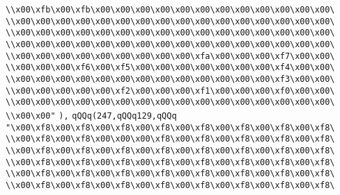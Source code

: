 \verb|\\x00\xfb\x00\xfb\x00\x00\x00\x00\x00\x00\x00\x00\x00\x00\x00\x00\|\newline
\verb|\\x00\x00\x00\x00\x00\x00\x00\x00\x00\x00\x00\x00\x00\x00\x00\x00\|\newline
\verb|\\x00\x00\x00\x00\x00\x00\x00\x00\x00\x00\x00\x00\x00\x00\x00\x00\|\newline
\verb|\\x00\x00\x00\x00\x00\x00\x00\x00\x00\x00\x00\x00\x00\x00\x00\x00\|\newline
\verb|\\x00\x00\x00\x00\x00\x00\x00\x00\x00\xfa\x00\x00\x00\xf7\x00\x00\|\newline
\verb|\\x00\x00\x00\xf6\x00\xf5\x00\x00\x00\x00\x00\x00\x00\xf4\x00\x00\|\newline
\verb|\\x00\x00\x00\x00\x00\x00\x00\x00\x00\x00\x00\x00\x00\xf3\x00\x00\|\newline
\verb|\\x00\x00\x00\x00\x00\xf2\x00\x00\x00\xf1\x00\x00\x00\xf0\x00\x00\|\newline
\verb|\\x00\x00\x00\x00\x00\x00\x00\x00\x00\x00\x00\x00\x00\x00\x00\x00\|\newline
\verb|\\x00\x00"|\newline
\verb|),|\newline
\verb|qQQq(247,qQQq129,qQQq|\newline
\verb|"\x00\xf8\x00\xf8\x00\xf8\x00\xf8\x00\xf8\x00\xf8\x00\xf8\x00\xf8\|\newline
\verb|\\x00\xf8\x00\xf8\x00\x00\x00\xf8\x00\xf8\x00\xf8\x00\xf8\x00\xf8\|\newline
\verb|\\x00\xf8\x00\xf8\x00\xf8\x00\xf8\x00\xf8\x00\xf8\x00\xf8\x00\xf8\|\newline
\verb|\\x00\xf8\x00\xf8\x00\xf8\x00\xf8\x00\xf8\x00\xf8\x00\xf8\x00\xf8\|\newline
\verb|\\x00\xf8\x00\xf8\x00\xf8\x00\xf8\x00\xf8\x00\xf8\x00\xf8\x00\xf8\|\newline
\verb|\\x00\xf8\x00\xf8\x00\xf8\x00\xf8\x00\xf8\x00\xf8\x00\xf8\x00\xf8\|\newline
